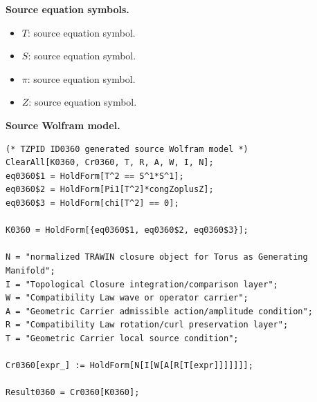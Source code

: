 \begin{minipage}[t]{0.49\linewidth}
\begingroup
\small
\raggedright
\textbf{Source equation symbols.}\par
\begin{itemize}[leftmargin=1.35em,itemsep=1pt,topsep=1pt,parsep=0pt]
    \item $T$: source equation symbol.
    \item $S$: source equation symbol.
    \item $\pi$: source equation symbol.
    \item $Z$: source equation symbol.
\end{itemize}
\endgroup
\end{minipage}\hfill
\begin{minipage}[t]{0.47\linewidth}
\begingroup
\scriptsize
\raggedright
\textbf{Source Wolfram model.}\par
\begin{Verbatim}[fontsize=\tiny,breaklines=true,breakanywhere=true]
(* TZPID ID0360 generated source Wolfram model *)
ClearAll[K0360, Cr0360, T, R, A, W, I, N];
eq0360$1 = HoldForm[T^2 == S^1*S^1];
eq0360$2 = HoldForm[Pi1[T^2]*congZoplusZ];
eq0360$3 = HoldForm[chi[T^2] == 0];

K0360 = HoldForm[{eq0360$1, eq0360$2, eq0360$3}];

N = "normalized TRAWIN closure object for Torus as Generating Manifold";
I = "Topological Closure integration/comparison layer";
W = "Compatibility Law wave or operator carrier";
A = "Geometric Carrier admissible action/amplitude condition";
R = "Compatibility Law rotation/curl preservation layer";
T = "Geometric Carrier local source condition";

Cr0360[expr_] := HoldForm[N[I[W[A[R[T[expr]]]]]]];

Result0360 = Cr0360[K0360];
\end{Verbatim}
\endgroup
\end{minipage}

